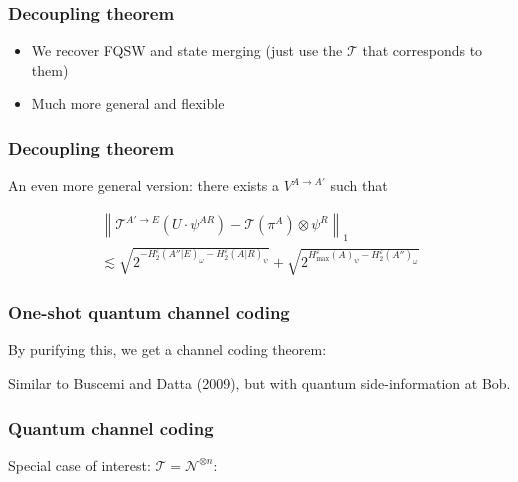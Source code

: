 \documentclass[12pt]{beamer}
\begin{document}
\begin{frame}
\frametitle{Decoupling theorem}
\begin{itemize}
\item We recover FQSW and state merging (just use the $\mathcal{T}$ that corresponds to them)
\item Much more general and flexible
\end{itemize}
\end{frame}


\begin{frame}
\frametitle{Decoupling theorem}
An even more general version: there exists a $V^{A \rightarrow A'}$ such that
\vspace{-0.5cm}
    \begin{figure}
    \scalebox{0.9}{}
    \end{figure}
\vspace{-1cm}
\begin{multline*}
 \left\| \mathcal{T}^{A' \rightarrow E}(U \cdot \psi^{AR}) - \mathcal{T}(\pi^A) \otimes \psi^R \right\|_1\\
\lesssim \sqrt{2^{-H^{\varepsilon}_2(A''|E)_{\omega} -H^{\varepsilon}_2(A|R)_{\psi}}} + \sqrt{2^{H^{\varepsilon}_{\max}(A)_{\psi} - H_2^{\varepsilon}(A'')_{\omega}}} 
\end{multline*}
\end{frame}

\begin{frame}
	\frametitle{One-shot quantum channel coding}
	By purifying this, we get a channel coding theorem:
    \begin{figure}
    \scalebox{0.92}{}
    \end{figure}
    Similar to Buscemi and Datta (2009), but with quantum side-information at Bob.
\end{frame}

\begin{frame}
	\frametitle{Quantum channel coding}
	Special case of interest: $\mathcal{T} = \mathcal{N}^{\otimes n}$:
	\vspace{-1cm}
    \begin{figure}
    \scalebox{0.9}{}
    \end{figure}
\end{frame}
\end{document}
